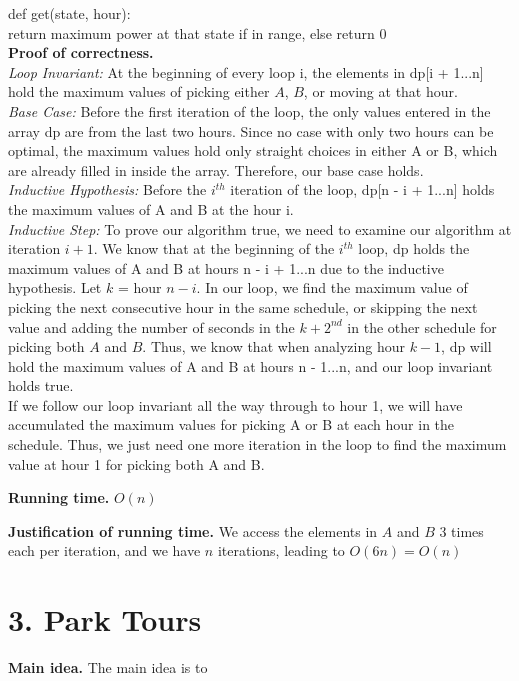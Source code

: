 \documentclass[11pt]{article}
\begin{document}
\noindent def get(state, hour): \\
\indent return maximum power at that state if in range, else return 0 \\
\noindent
\textbf{Proof of correctness.}\\
\textit{Loop Invariant:} At the beginning of every loop i, the elements in dp[i + 1...n] hold the maximum values of picking either $A$, $B$, or moving at that hour.  \\
\textit{Base Case:} Before the first iteration of the loop, the only values entered in the array dp are from the last two hours.  Since no case with only two hours can be optimal, the maximum values hold only straight choices in either A or B, which are already filled in inside the array.  Therefore, our base case holds. \\
\textit{Inductive Hypothesis:} Before the $i^{th}$ iteration of the loop, dp[n - i + 1...n] holds the maximum values of A and B at the hour i. \\
\textit{Inductive Step:} To prove our algorithm true, we need to examine our algorithm at iteration $i + 1$.  We know that at the beginning of the $i^{th}$ loop, dp holds the maximum values of A and B at hours n - i + 1...n due to the inductive hypothesis.  Let $k$ = hour $n - i$.  In our loop, we find the maximum value of picking the next consecutive hour in the same schedule, or skipping the next value and adding the number of seconds in the $k+2^{nd}$ in the other schedule for picking both $A$ and $B$.  Thus, we know that when analyzing hour $k - 1$, dp will hold the maximum values of A and B at hours n - 1...n, and our loop invariant holds true. \\

\noindent If we follow our loop invariant all the way through to hour 1, we will have accumulated the maximum values for picking A or B at each hour in the schedule.  Thus, we just need one more iteration in the loop to find the maximum value at hour 1 for picking both A and B.

\noindent
\textbf{Running time.}
$O(n)$


\noindent
\textbf{Justification of running time.}
We access the elements in $A$ and $B$ 3 times each per iteration, and we have $n$ iterations, leading to $O(6n) = O(n)$



\newpage
\section*{3. Park Tours}
\noindent
\textbf{Main idea.}
The main idea is to 
\end{document}
